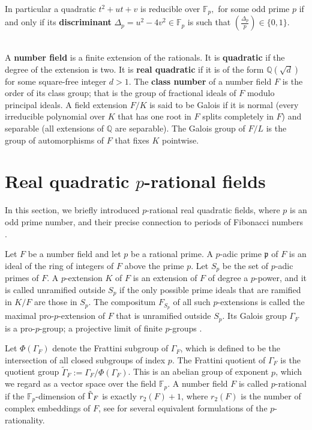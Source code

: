 \documentclass[12pt,reqno]{amsart}
\newcommand{\F}{\mathbb{F}}
\newcommand{\Q}{\mathbb{Q}}
\begin{document}
 In particular a quadratic $t^2+ut+v$ is reducible over $\F_p,$ for some odd prime $p$  if and only if its {\bf discriminant}
 $\Delta_p=u^2-4v^2 \in \F_p$ is such that $(\frac{\Delta_p}{p})\in \{0,1\}.$\\ \ \

 A {\bf number field} is a finite extension of the rationals. It is {\bf quadratic} if the degree of the extension is two. It is {\bf real quadratic} if it is of the form $\mathbb{Q}(\sqrt{d})$ for some square-free integer $d>1.$ The {\bf class number} of a number field $F$ is the order of its class group; that is the group of fractional ideals of $F$ modulo principal ideals. A field extension $F/K$ is said to be Galois if it is normal (every irreducible polynomial over $K$ that has one root in $F$ splits completely in $F$) and separable (all extensions of ${\Q}$ are separable). The Galois group of $F/L$ is the group of automorphisms of $F$ that fixes $K$ pointwise.

\section{Real quadratic $p$-rational fields}\label{p-rational fields}



In this section, we briefly introduced $p$-rational real quadratic fields, where $p$ is an odd prime number, and their precise connection to periods of Fibonacci numbers \cite{B,B2}.

Let $F$ be a number field and let $p$ be a rational prime. A $p$-adic prime $\mathfrak{p}$ of $F$ is an ideal of the ring of integers of $F$ above the prime $p$. Let $S_p$ be the set of $p$-adic primes of $F$. A $p$-extension $K$ of $F$ is an extension of $F$ of degree a $p$-power, and it is called unramified outside $S_p$ if the only possible prime ideals that are ramified in $K/F$ are those in $S_p$. The compositum $F_{S_p}$ of all such $p$-extensions is called the maximal pro-$p$-extension of $F$ that is unramified outside $S_p$. Its Galois group $\Gamma_F$ is a pro-$p$-group; a projective limit of finite $p$-groups \cite[Section 1.4]{Se}.

Let $\Phi(\Gamma_F)$ denote the Frattini subgroup
of $\Gamma_F$, which is defined to be the intersection of all closed subgroups of index $p$.
The Frattini quotient of $\Gamma_F$ is the quotient group $\tilde{\Gamma}_{F}:=\Gamma_F/\Phi(\Gamma_F)$.
This is an abelian
group of exponent $p$, which we regard as a vector space over the field ${\F}_p$. A number field $F$ is called $p$-rational if
the ${\F}_p$-dimension of $\Tilde{\Gamma}_{F}$ is exactly $r_2(F)+1$, where $r_2(F)$ is the number of complex embeddings of $F$, see \cite[Theorem and Definition 2.1]{Movahhedi-Nguyen} for several equivalent formulations of the $p$-rationality.
\end{document}
